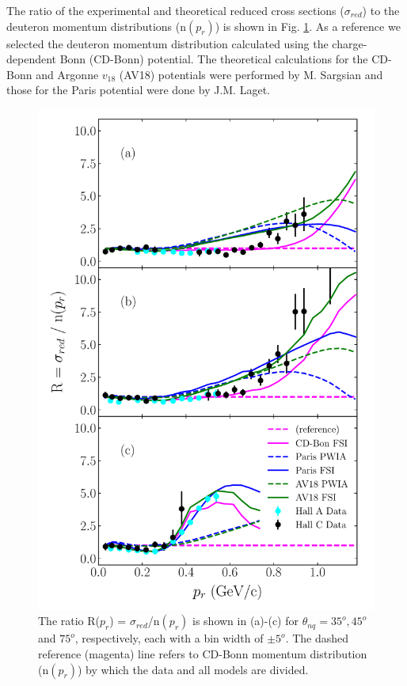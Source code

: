 \indent The ratio of the experimental and theoretical reduced cross sections ($\sigma_{red}$) to the deuteron momentum distributions (n$(p_{r})$) is shown in Fig. \ref{fig:fig2}. As a reference we selected the
deuteron momentum distribution calculated using the charge-dependent Bonn (CD-Bonn) potential\cite{PhysRevC.63.024001}. The theoretical calculations for the CD-Bonn and Argonne $v_{18}$ (AV18)\cite{PhysRevC.51.38}
potentials were performed by M. Sargsian\cite{PhysRevC.82.014612} and those for the Paris potential\cite{PhysRevC.21.861} were done by J.M. Laget\cite{LAGET2005}.
\begin{figure}[h!]
\includegraphics[scale=0.5]{../prl_plots/PRL_plot2.pdf}
\caption{The ratio R($p_{r}$) = $\sigma_{red}$/n$(p_{r})$ is shown in (a)-(c) for $\theta_{nq}=35^{o}, 45^{o}$ and $75^{o}$, respectively, each with a bin width of $\pm 5^{o}$. The dashed reference (magenta) line refers to CD-Bonn momentum distribution (n$(p_{r})$) by which the data and all models are divided. }
\label{fig:fig2}
\end{figure} \\
